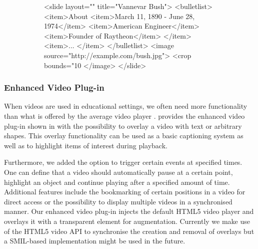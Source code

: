      \begin{figure}[h!]
      \begin{subfigure}{0.53\textwidth}
       \vspace{-1em}
       \begin{lstxml*}
<slide layout="" title="Vannevar Bush">
 <bulletlist>
  <item>About
   <item>March 11, 1890 - June 28, 1974</item>
   <item>American Engineer</item>
   <item>Founder of Raytheon</item>
  </item>
  <item>...
  </item>
 </bulletlist>
 <image source="http://example.com/bush.jpg">
  <crop bounds="10%
 </image>
</slide>
       \end{lstxml*}
      \end{subfigure}
      \hfill
      \begin{subfigure}{0.43\textwidth}
      \end{subfigure}
      \renewcommand{\figurename}{Listing}
      \renewcommand{\figureshortname}{Lst.}
     \end{figure}

    \subsubsection{Enhanced Video Plug-in}

     When videos are used in educational settings, we often need more
     functionality than what is offered by the average video player
     \citep{reuss-1}. \mxp provides the enhanced video plug-in shown in
      with the possibility to overlay a video with text or
     arbitrary shapes. This overlay functionality can be used as a basic
     captioning system as well as to highlight items of interest during
     playback.

     Furthermore, we added the option to trigger certain events at specified
     times. One can define that a video should automatically pause at a certain
     point, highlight an object and continue playing after a specified amount
     of time. Additional features include the bookmarking of certain positions
     in a video for direct access or the possibility to display multiple videos
     in a synchronised manner. Our enhanced video plug-in injects the default
     HTML5 video player and overlays it with a transparent  element
     for augmentation. Currently we make use of the HTML5 video API to
     synchronise the creation and removal of overlays but a SMIL-based
     implementation might be used in the future.

